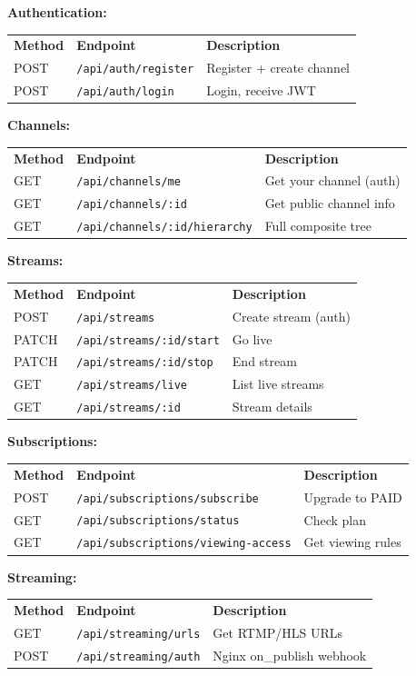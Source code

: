 \documentclass[10pt]{article}
\begin{document}
\noindent
\begin{tcolorbox}[
  colback=white,
  colframe=dark,
  arc=3pt,
  boxrule=1pt,
  before skip=8pt,
  after skip=8pt
]

\textbf{Authentication:}
\begin{tabular}{lll}
\textbf{Method} & \textbf{Endpoint} & \textbf{Description} \\
POST & \texttt{/api/auth/register} & Register + create channel \\
POST & \texttt{/api/auth/login} & Login, receive JWT
\end{tabular}

\textbf{Channels:}
\begin{tabular}{lll}
\textbf{Method} & \textbf{Endpoint} & \textbf{Description} \\
GET & \texttt{/api/channels/me} & Get your channel (auth) \\
GET & \texttt{/api/channels/:id} & Get public channel info \\
GET & \texttt{/api/channels/:id/hierarchy} & Full composite tree
\end{tabular}

\textbf{Streams:}
\begin{tabular}{lll}
\textbf{Method} & \textbf{Endpoint} & \textbf{Description} \\
POST & \texttt{/api/streams} & Create stream (auth) \\
PATCH & \texttt{/api/streams/:id/start} & Go live \\
PATCH & \texttt{/api/streams/:id/stop} & End stream \\
GET & \texttt{/api/streams/live} & List live streams \\
GET & \texttt{/api/streams/:id} & Stream details
\end{tabular}

\textbf{Subscriptions:}
\begin{tabular}{lll}
\textbf{Method} & \textbf{Endpoint} & \textbf{Description} \\
POST & \texttt{/api/subscriptions/subscribe} & Upgrade to PAID \\
GET & \texttt{/api/subscriptions/status} & Check plan \\
GET & \texttt{/api/subscriptions/viewing-access} & Get viewing rules
\end{tabular}

\textbf{Streaming:}
\begin{tabular}{lll}
\textbf{Method} & \textbf{Endpoint} & \textbf{Description} \\
GET & \texttt{/api/streaming/urls} & Get RTMP/HLS URLs \\
POST & \texttt{/api/streaming/auth} & Nginx on\_publish webhook
\end{tabular}

\end{tcolorbox}
\end{document}
